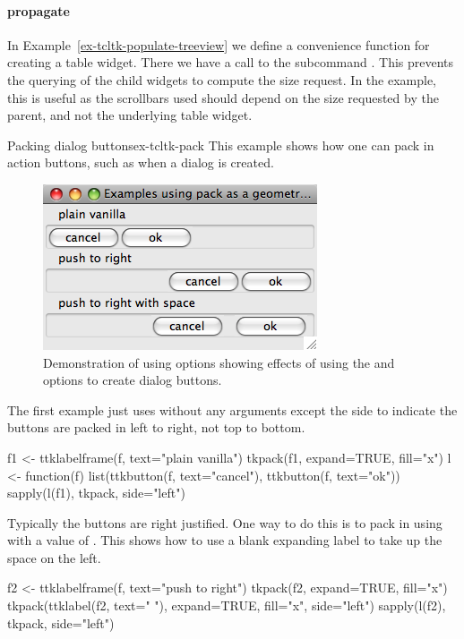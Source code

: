 %


\paragraph{propagate}
In Example~\ref{ex-tcltk-populate-treeview} we define a convenience
function for creating a table widget. There we have a call to the
subcommand .  This prevents the querying
of the child widgets to compute the size request. In the example, this
is useful as the scrollbars used should depend on the size requested
by the parent, and not the underlying table widget.


\begin{example}{Packing dialog buttons}{ex-tcltk-pack}
This example shows how one can pack in action buttons, such as when a
dialog is created.

\begin{figure}
  \centering
  \includegraphics[width=.5\textwidth]{fig-tcltk-pack-buttons.png}
  \caption{Demonstration of using  options showing
    effects of using the 
    and  options to create
    dialog buttons.}
  \label{fig:tcltk-pack-buttons}
\end{figure}


The first example just uses  without any arguments except
the side to indicate the buttons are packed in left to right, not top
to bottom.
\begin{Schunk}
\begin{Sinput}
 f1 <- ttklabelframe(f, text="plain vanilla")
 tkpack(f1, expand=TRUE, fill="x")
 l <- function(f) 
   list(ttkbutton(f, text="cancel"), ttkbutton(f, text="ok"))
 sapply(l(f1), tkpack, side="left")
\end{Sinput}
\end{Schunk}

Typically the buttons are right justified. One way to do this is to
pack in using  with a value of . This shows
how to use a blank expanding label to take up the space on the left.
\begin{Schunk}
\begin{Sinput}
 f2 <- ttklabelframe(f, text="push to right")
 tkpack(f2, expand=TRUE, fill="x")
 tkpack(ttklabel(f2, text=" "), 
        expand=TRUE, fill="x", side="left")
 sapply(l(f2), tkpack, side="left")
\end{Sinput}
\end{Schunk}


\end{example}
